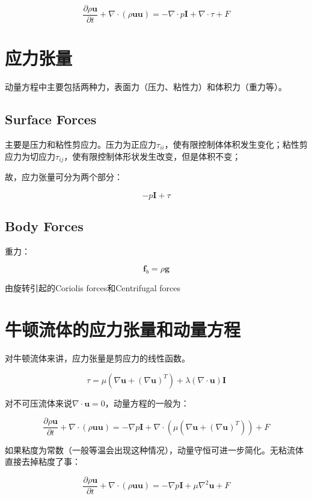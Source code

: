 \begin{equation}
\frac{\partial \rho\bm{u}}{\partial t} + \nabla\cdot(\rho\bm{uu}) = -\nabla\cdot p\bm{I} + \nabla\cdot\tau + F
\end{equation}

\section{应力张量}
动量方程中主要包括两种力，表面力（压力、粘性力）和体积力（重力等）。

\subsection{Surface Forces}
主要是压力和粘性剪应力。压力为正应力$ \tau_{ii} $，使有限控制体体积发生变化；粘性剪应力为切应力$ \tau_{ij} $，使有限控制体形状发生改变，但是体积不变；

故，应力张量可分为两个部分：

\[-p\bm{I}+\tau\]

\subsection{Body Forces}

重力：

\[\bm{f}_b = \rho \bm{g}\]

由旋转引起的Coriolis forces和Centrifugal forces

\section{牛顿流体的应力张量和动量方程}
对牛顿流体来讲，应力张量是剪应力的线性函数。

\begin{equation}
\tau = \mu\left(\nabla\bm{u}+(\nabla\bm{u})^T\right)+\lambda(\nabla\cdot \bm{u})\bm{I}
\end{equation}

对不可压流体来说$ \nabla\cdot\bm{u} = 0 $，动量方程的一般为：

\begin{equation}
\frac{\partial \rho\bm{u}}{\partial t} + \nabla\cdot(\rho\bm{uu}) = -\nabla p\bm{I} + \nabla\cdot(\mu\left(\nabla\bm{u}+(\nabla\bm{u})^T\right)) + F
\end{equation}

如果粘度为常数（一般等温会出现这种情况），动量守恒可进一步简化。无粘流体直接去掉粘度了事：

\begin{equation}
\frac{\partial \rho\bm{u}}{\partial t} + \nabla\cdot(\rho\bm{uu}) = -\nabla p\bm{I} + \mu\nabla^2\bm{u} + F
\end{equation}

